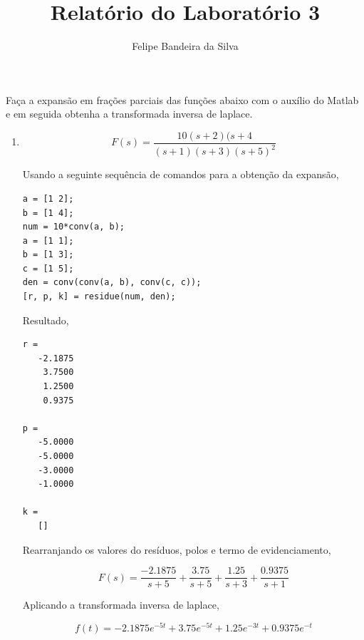 \documentclass[a4paper, 10pt]{article}
\title{Relatório do Laboratório 3}
\author{Felipe Bandeira da Silva}
\begin{document}
\maketitle
\lstset{language = Matlab}

\begin{list}{\textbf{Questão .}}{
\setlength{\labelwidth}{-2mm} \setlength{\parsep}{0mm}
\setlength{\topsep}{0mm} \setlength{\leftmargin}{0mm}}
\renewcommand{\labelenumi}{(\alph{enumi})}

\item Faça a expansão em frações parciais das funções abaixo com o auxílio do Matlab
e em seguida obtenha a transformada inversa de laplace.
    \begin{enumerate}
        \item       
            $$ 
                F(s) = \frac{10(s+2)(s+4}{(s+1)(s+3)(s+5)^2}
            $$

Usando a seguinte sequência de comandos para a obtenção da expansão,
            \begin{lstlisting}
a = [1 2];
b = [1 4];
num = 10*conv(a, b);
a = [1 1];
b = [1 3];
c = [1 5];
den = conv(conv(a, b), conv(c, c));
[r, p, k] = residue(num, den);

            \end{lstlisting}


        Resultado,

        \begin{lstlisting}
r = 
   -2.1875 
    3.7500
    1.2500
    0.9375

p = 
   -5.0000
   -5.0000
   -3.0000
   -1.0000

k = 
   []

        \end{lstlisting}
        Rearranjando os valores do resíduos, polos e termo de evidenciamento,

            $$
                F(s) = \frac{-2.1875}{s+5} + \frac{3.75}{s+5} + \frac{1.25}{s+3} + \frac{0.9375}{s+1}
            $$

            Aplicando a transformada inversa de laplace,

            $$
            f(t) = -2.1875 e^{-5t} + 3.75 e^{-5t} + 1.25 e^{-3t} + 0.9375 e^{-t}
            $$
         



\end{enumerate}
\end{list}
\end{document}
